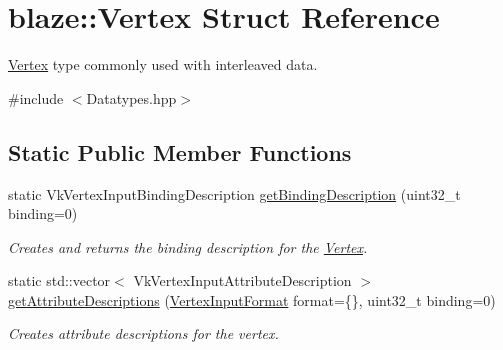 \hypertarget{structblaze_1_1Vertex}{}\section{blaze\+:\+:Vertex Struct Reference}
\label{structblaze_1_1Vertex}


\hyperlink{structblaze_1_1Vertex}{Vertex} type commonly used with interleaved data.  




{\ttfamily \#include $<$Datatypes.\+hpp$>$}

\subsection*{Static Public Member Functions}
\begin{DoxyCompactItemize}
\item 
static Vk\+Vertex\+Input\+Binding\+Description \hyperlink{structblaze_1_1Vertex_a81e9b6e602df735ad45fcc5d2c3305c6}{get\+Binding\+Description} (uint32\+\_\+t binding=0)
\begin{DoxyCompactList}\small\item\em Creates and returns the binding description for the \hyperlink{structblaze_1_1Vertex}{Vertex}. \end{DoxyCompactList}\item 
static std\+::vector$<$ Vk\+Vertex\+Input\+Attribute\+Description $>$ \hyperlink{structblaze_1_1Vertex_aa9ee165c3cfdac311ca8ffc382524d4b}{get\+Attribute\+Descriptions} (\hyperlink{structblaze_1_1VertexInputFormat}{Vertex\+Input\+Format} format=\{\}, uint32\+\_\+t binding=0)
\begin{DoxyCompactList}\small\item\em Creates attribute descriptions for the vertex. \end{DoxyCompactList}\end{DoxyCompactItemize}
